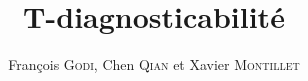 \documentclass[conference]{IEEEtran}
\begin{document}
%
\title{T-diagnosticabilit\'e}


\author{Fran\c{c}ois \textsc{Godi}, Chen \textsc{Qian} et Xavier \textsc{Montillet}}


% 








\maketitle
\end{document}
